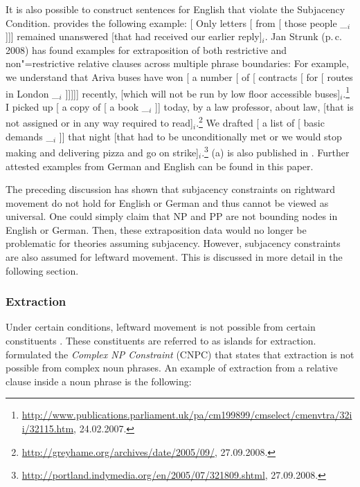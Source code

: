 \noindent
It is also possible to construct sentences for English that violate the Subjacency Condition.
\citet[]{Uszkoreit90a} provides the following example:
\ea
{}[ Only letters [ from [ those people \_$_i$]]] remained
unanswered [that had received our earlier reply]$_i$.
\z
%
Jan Strunk (p.\,c.\, 2008) has found examples for extraposition of both restrictive and non"=restrictive relative clauses across
multiple phrase boundaries:
\eal
\ex For example, we understand that Ariva buses have won [ a number [ of [
      contracts [ for [ routes in London \_$_i$ ]]]]] recently, [which will not be run
by low floor accessible buses]$_i$.\footnote{
\url{http://www.publications.parliament.uk/pa/cm199899/cmselect/cmenvtra/32ii/32115.htm},
24.02.2007.
}
\ex I picked up [ a copy of [ a book \_$_i$ ]] today, by a law
professor, about law, [that is not assigned or in any way required to read]$_i$.\footnote{
\url{http://greyhame.org/archives/date/2005/09/}, 27.09.2008.
}
\ex We drafted [ a list of [ basic demands \_$_i$ ]] that night [that had to be
  unconditionally met or we would stop making and 
delivering pizza and go on strike]$_i$.\footnote{
\url{http://portland.indymedia.org/en/2005/07/321809.shtml}, 27.09.2008.
}
\zl
(a) is also published in . Further attested examples from German and
English can be found in this paper.

\addlines
The preceding discussion has shown that subjacency constraints on rightward movement do not hold for English or German and thus cannot be
viewed as universal. One could simply claim that NP and PP are not bounding nodes in English or German. Then, these extraposition data would
no longer be problematic for theories assuming subjacency. However, subjacency constraints are also
assumed for leftward movement. This is discussed in more detail in the following section. 

\subsubsection{Extraction}
\label{Abschnitt-Subjazenz-Extraktion}

Under certain conditions, leftward movement is not possible from certain constituents \citep{Ross67}. 
These constituents are referred to as islands for extraction. \citet[Section~4.1]{Ross67} formulated the \emph{Complex NP Constraint} (CNPC) that states that extraction is not possible from complex noun phrases. An example of extraction
  from a relative clause inside a noun phrase is the following:

